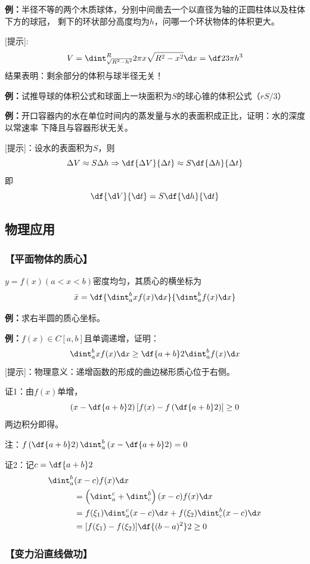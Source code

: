 {\bf 例：}半径不等的两个木质球体，分别中间凿去一个以直径为轴的正圆柱体以及柱体下方的球冠，
剩下的环状部分高度均为$h$，问哪一个环状物体的体积更大。

[提示]:
$$V=\dint_{\sqrt{R^2-h^2}}^R2\pi x\sqrt{R^2-x^2}\d x=\df23\pi h^3$$
结果表明：剩余部分的体积与球半径无关！

{\bf 例：}试推导球的体积公式和球面上一块面积为$S$的球心锥的体积公式（$rS/3$）

{\bf 例：}开口容器内的水在单位时间内的蒸发量与水的表面积成正比，证明：水的深度以常速率
下降且与容器形状无关。

[提示]：设水的表面积为$S$，则
$$\Delta V\approx S\Delta h\Rightarrow
\df{\Delta V}{\Delta t}\approx S\df{\Delta h}{\Delta t}$$
即
$$\df{\d V}{\d t}=S\df{\d h}{\d t}$$

\subsection{物理应用}

\subsubsection{【平面物体的质心】}
$y=f(x)(a<x<b)$密度均匀，其质心的横坐标为
$$\bar{x}=\df{\dint_a^bxf(x)\d x}{\dint_a^bf(x)\d x}$$

{\bf 例：}求右半圆的质心坐标。

{\bf 例：}$f(x)\in C[a,b]$且单调递增，证明：
$$\dint_a^bxf(x)\d x\geq\df{a+b}2\dint_a^bf(x)\d x$$
[提示]：物理意义：递增函数的形成的曲边梯形质心位于右侧。

证1：由$f(x)$单增，
$$\left(x-\df{a+b}2\right)\left[f(x)-f\left(
\df{a+b}2\right)\right]\geq0$$
两边积分即得。

注：$f\left(\df{a+b}2\right)\dint_a^b\left(x-\df{a+b}2\right)=0$

证2：记$c=\df{a+b}2$
\begin{align}
	\dint_a^b&(x-c)f(x)\d x\notag\\
	&=\left(\dint_a^c+\dint_c^b\right)(x-c)f(x)\d x\notag\\
	&=f(\xi_1)\dint_a^c(x-c)\d x+f(\xi_2)\dint_c^b(x-c)\d x\notag\\
	&=[f(\xi_1)-f(\xi_2)]\df{(b-a)^2}2\geq0
\end{align}

\subsubsection{【变力沿直线做功】}

